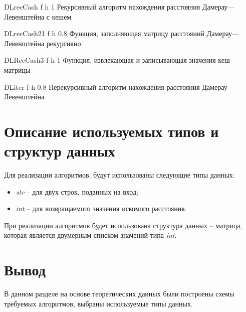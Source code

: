{DLrecCash} %
{f} %
{h} %
{1\textwidth} %
{Рекурсивный алгоритм нахождения расстояния Дамерау---Левенштейна с кешем} %

{DLrecCash21} %
{f} %
{h} %
{0.8\textwidth} %
{Функция, заполняющая матрицу расстояний Дамерау---Левенштейна рекурсивно} %

{DLRecCash3} %
{f} %
{h} %
{1\textwidth} %
{Функция, извлекающая и записывающая значения кеш-матрицы} %


{DLiter} %
{f} %
{h} %
{0.8\textwidth} %
{Нерекурсивный алгоритм нахождения расстояния Дамерау---Левенштейна} %


\section{Описание используемых типов и структур данных}

Для реализации алгоритмов, будут использованы следующие типы данных:
\begin{itemize}
	\item \textit{str} -- для двух строк, поданных на вход;
	\item \textit{int} -- для возвращаемого значения искомого расстояния.
\end{itemize}

При реализации алгоритмов будет использована структура данных -- матрица, которая является двумерным списком значений типа \textit{int}.


\section*{Вывод}

В данном разделе на основе теоретических данных были построены схемы требуемых алгоритмов, выбраны используемые типы данных.

